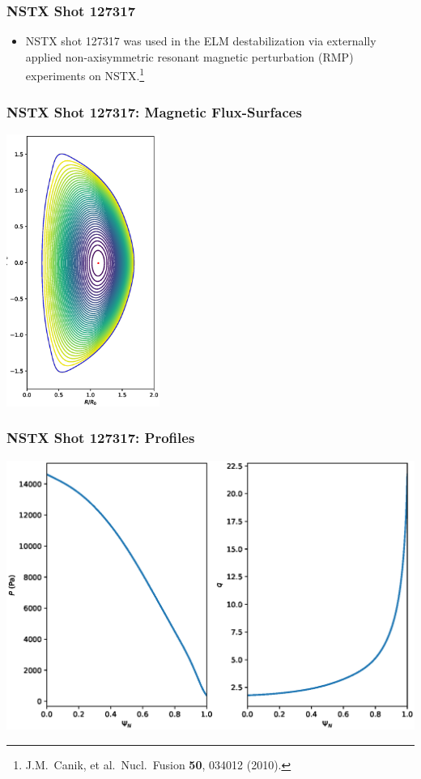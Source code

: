 \documentclass{beamer}
\begin{document}
\begin{frame}
\frametitle{NSTX Shot 127317}
 
\begin{itemize}
\item NSTX shot 127317 was used in the ELM destabilization via externally applied non-axisymmetric
resonant magnetic perturbation (RMP) experiments on NSTX.\footnote{J.M.~Canik, et al.\ Nucl.\ Fusion {\bf 50}, 034012 (2010).}
\end{itemize}
\end{frame}

\begin{frame}
\frametitle{NSTX Shot 127317: Magnetic Flux-Surfaces}

\begin{center}
\includegraphics[height=3.5in]{Equilibrium.eps}
\end{center}

\end{frame}

\begin{frame}
\frametitle{NSTX Shot 127317: Profiles}

\begin{center}
\includegraphics[width=\textwidth]{Profiles.eps}
\end{center}

\end{frame}
\end{document}

